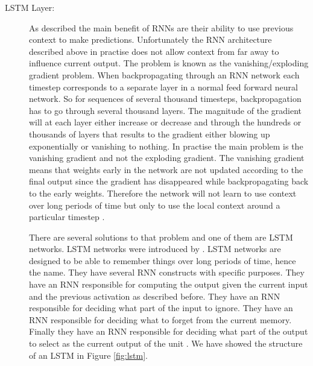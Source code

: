 \begin{description}
    \item[\gls{LSTM} Layer:]
        \label{layer:LSTM}

        As described the main benefit of \glspl{RNN} are their ability to use
        previous context to make predictions. Unfortunately the \gls{RNN}
        architecture described above in practise does not allow context from
        far away to influence current output. The problem is known as the
        vanishing/exploding gradient problem. When backpropagating through an
        \gls{RNN} network each timestep corresponds to a separate layer in a
        normal feed forward neural network. So for sequences of several thousand
        timesteps, backpropagation has to go through several thousand layers.
        The magnitude of the gradient will at each layer either increase or
        decrease and through the hundreds or thousands of layers that results to
        the gradient either blowing up exponentially or vanishing to nothing.
        In practise the main problem is the vanishing gradient and not the
        exploding gradient. The vanishing gradient means that weights early
        in the network are not updated according to the final output since
        the gradient has disappeared while backpropagating back to the early
        weights. Therefore the network will not learn to use context over long
        periods of time but only to use the local context around a particular
        timestep \citep{DBLP:series/sci/2012-385}.

        There are several solutions to that problem and one of them are
        \gls{LSTM} networks. \gls{LSTM} networks were introduced by
        \citet{Hochreiter:1997:LSM:1246443.1246450}. \gls{LSTM} networks are
        designed to be able to remember things over long periods of time, hence
        the name. They have several \gls{RNN} constructs with specific purposes.
        They have an \gls{RNN} responsible for computing the output given the
        current input and the previous activation as described before. They have
        an \gls{RNN} responsible for deciding what part of the input to ignore.
        They have an \gls{RNN} responsible for deciding what to forget from the
        current memory. Finally they have an \gls{RNN} responsible for deciding
        what part of the output to select as the current output of the unit
        \citep{DBLP:series/sci/2012-385}. We have showed the structure of an
        \gls{LSTM} in Figure \ref{fig:lstm}.


\end{description}

